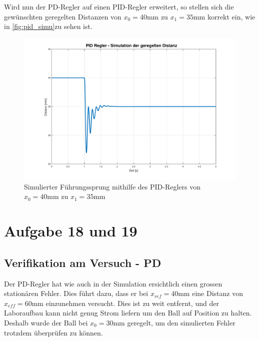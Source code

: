 			Wird nun der PD-Regler auf einen PID-Regler erweitert, so stellen sich die gewünschten geregelten Distanzen von   $x_0 = 40\si{\milli\meter}$ zu $x_1 = 35\si{\milli\meter} $ korrekt ein, wie in \autoref{fig:pid_simu}zu sehen ist.
			\begin{figure}[H]
				\centering
				\includegraphics[width=\textwidth]{./figure/PID_simu.pdf}
				\caption{Simulierter Führungssprung mithilfe des PID-Reglers von $x_0 = 40\si{\milli\meter}$ zu $x_1 = 35\si{\milli\meter}$}
				\label{fig:pid_simu}
			\end{figure}
\newpage

\section{Aufgabe 18 und 19}\label{sec:Aufgabe1819}
	\subsection*{Verifikation am Versuch - PD}

	Der PD-Regler hat wie auch in der Simulation ersichtlich einen grossen stationären Fehler. Dies führt dazu, dass er bei $x_{ref}=40\si{\milli\meter}$ eine Distanz von $x_{eff}=60\si{\milli\meter}$ einzunehmen versucht. Dies ist zu weit entfernt, und der Laboraufbau kann nicht genug Strom liefern um den Ball auf Position zu halten. Deshalb wurde der Ball bei $x_0 = 30\si{\milli\meter}$ geregelt, um den simulierten Fehler trotzdem überprüfen zu können.
			
